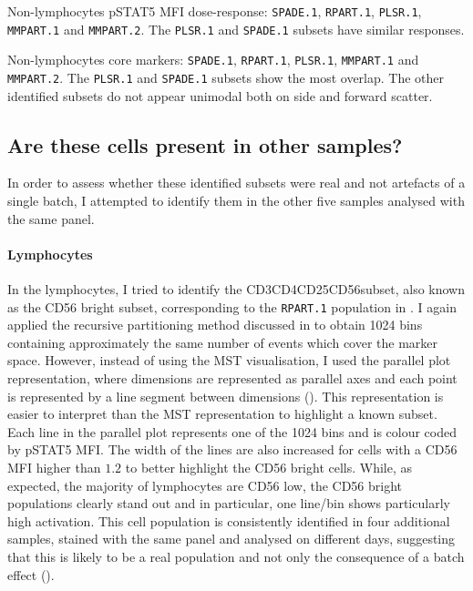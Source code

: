 { Non-lymphocytes pSTAT5 MFI dose-response: \texttt{SPADE.1}, \texttt{RPART.1}, \texttt{PLSR.1}, \texttt{MMPART.1} and \texttt{MMPART.2}. }
{
    The \texttt{PLSR.1} and \texttt{SPADE.1} subsets have similar responses.
}


{ Non-lymphocytes core markers: \texttt{SPADE.1}, \texttt{RPART.1}, \texttt{PLSR.1}, \texttt{MMPART.1} and \texttt{MMPART.2}.  }
{
    The \texttt{PLSR.1} and \texttt{SPADE.1} subsets show the most overlap.
    The other identified subsets do not appear unimodal both on side and forward scatter.
}


\clearpage

\subsection{Are these cells present in other samples?}

In order to assess whether these identified subsets were real and not artefacts of a single batch, I attempted to identify them in the other five samples analysed with the same panel.

\paragraph{Lymphocytes}

In the lymphocytes, I tried to identify the CD3\negative CD4\negative CD25\negative CD56\positive  subset, also known as the CD56 bright subset, corresponding to the \texttt{RPART.1} population in .
I again applied the recursive partitioning method discussed in  to obtain 1024 bins containing approximately the same number of events which cover the marker space.
However, instead of using the \gls{MST} visualisation, I used the parallel plot representation, where dimensions are represented as parallel axes and each point is represented by a line segment between dimensions ().
This representation is easier to interpret than the \gls{MST} representation to highlight a known subset.
Each line in the parallel plot represents one of the 1024 bins and is colour coded by pSTAT5 MFI.
The width of the lines are also increased for cells with a CD56 MFI higher than $1.2$ to better highlight the CD56 bright cells.
While, as expected, the majority of lymphocytes are CD56 low, the CD56 bright populations clearly stand out and in particular, one line/bin shows particularly high activation.
This cell population is consistently identified in four additional samples, stained with the same panel and analysed on different days, suggesting that this is likely to be a real population and not only the consequence of a batch effect ().

